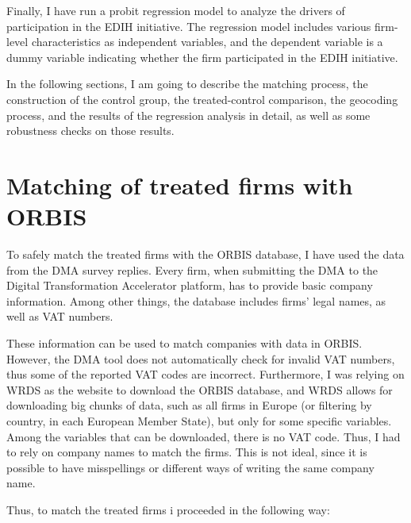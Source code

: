\documentclass[12pt]{report}
\begin{document}
\par Finally, I have run a probit regression model to analyze the drivers of participation in the EDIH initiative. The regression model includes various firm-level characteristics as independent variables, and the dependent variable is a dummy variable indicating whether the firm participated in the EDIH initiative.

\par In the following sections, I am going to describe the matching process, the construction of the control group, the treated-control comparison, the geocoding process, and the results of the regression analysis in detail, as well as some robustness checks on those results.

\newpage
\section{Matching of treated firms with ORBIS}

\par To safely match the treated firms with the ORBIS database, I have used the data from the DMA survey replies. Every firm, when submitting the DMA to the Digital Transformation Accelerator platform, has to provide basic company information. Among other things, the database includes firms' legal names, as well as VAT numbers. 

\par These information can be used to match companies with data in ORBIS. However, the DMA tool does not automatically check for invalid VAT numbers, thus some of the reported VAT codes are incorrect. Furthermore, I was relying on WRDS as the website to download the ORBIS database, and WRDS allows for downloading big chunks of data, such as all firms in Europe (or filtering by country, in each European Member State), but only for some specific variables. Among the variables that can be downloaded, there is no VAT code. Thus, I had to rely on company names to match the firms. This is not ideal, since it is possible to have misspellings or different ways of writing the same company name.

\par Thus, to match the treated firms i proceeded in the following way:
\end{document}
